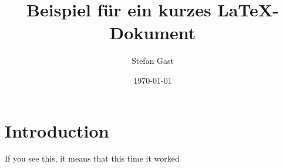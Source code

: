 \documentclass{scrartcl}
\title{Beispiel für ein kurzes \LaTeX-Dokument}
\author{Stefan Gast}
\date{\today}
\begin{document}


	\section{Introduction}
		If you see this, it means that this time it worked
	
\end{document}
